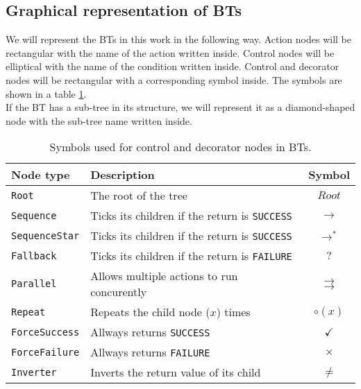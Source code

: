     \subsection{Graphical representation of BTs}
        We will represent the BTs in this work in the following way. Action nodes will be rectangular with the name of the action written inside. Control nodes will be elliptical with the name of the condition written inside. Control and decorator nodes will be rectangular with a corresponding symbol inside. The symbols are shown in a table \ref{tab:symbols}.\\
        If the BT has a sub-tree in its structure, we will represent it as a diamond-shaped node with the sub-tree name written inside.
        \begin{table}[H]
            \centering
            \begin{tabular}{|l|l|c|}
                \hline
                \textbf{Node type} & \textbf{Description} & \textbf{Symbol} \\
                \hline\hline
                \texttt{Root} & The root of the tree & $Root$ \\
                \hline
                \texttt{Sequence} & Ticks its children if the return is \texttt{SUCCESS} & $\to$ \\
                \hline
                \texttt{SequenceStar} & Ticks its children if the return is \texttt{SUCCESS} & $\to^{*}$ \\
                \hline
                \texttt{Fallback} & Ticks its children if the return is \texttt{FAILURE} & $?$ \\
                \hline
                \texttt{Parallel} & Allows multiple actions to run concurently & $\rightrightarrows$ \\
                \hline
                \texttt{Repeat} & Repeats the child node ($x$) times & $\circ(x)$ \\
                \hline
                \texttt{ForceSuccess} & Allways returns \texttt{SUCCESS} & $\checkmark$ \\
                \hline
                \texttt{ForceFailure} & Allways returns \texttt{FAILURE} & $\times$ \\
                \hline
                \texttt{Inverter} & Inverts the return value of its child & $\neq$ \\
                \hline
            \end{tabular}
            \caption{Symbols used for control and decorator nodes in BTs.}
            \label{tab:symbols}
        \end{table}
    
